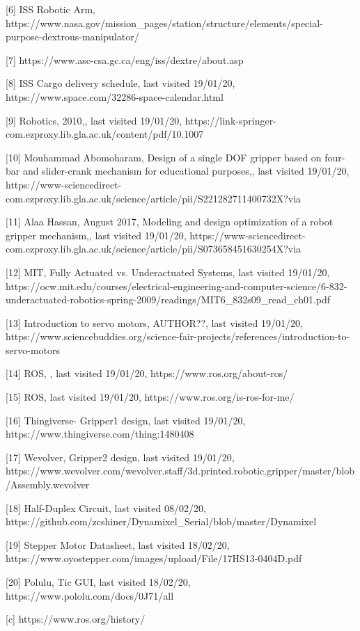 \documentclass{l4proj}
\begin{document}
[6] ISS Robotic Arm, https://www.nasa.gov/mission_pages/station/structure/elements/special-purpose-dextrous-manipulator/

[7] https://www.asc-csa.gc.ca/eng/iss/dextre/about.asp

[8] ISS Cargo delivery schedule, last visited 19/01/20, https://www.space.com/32286-space-calendar.html

[9] Robotics, 2010,, last visited 19/01/20, https://link-springer-com.ezproxy.lib.gla.ac.uk/content/pdf/10.1007%

[10] Mouhammad Abomoharam, Design of a single DOF gripper based on four-bar and slider-crank mechanism for educational purposes,, last visited 19/01/20, https://www-sciencedirect-com.ezproxy.lib.gla.ac.uk/science/article/pii/S221282711400732X?via%

[11] Alaa Hassan, August 2017, Modeling and design optimization of a robot gripper mechanism,, last visited 19/01/20, https://www-sciencedirect-com.ezproxy.lib.gla.ac.uk/science/article/pii/S073658451630254X?via%

[12] MIT, Fully Actuated vs. Underactuated Systems, last visited 19/01/20, https://ocw.mit.edu/courses/electrical-engineering-and-computer-science/6-832-underactuated-robotics-spring-2009/readings/MIT6_832s09_read_ch01.pdf

[13] Introduction to servo motors, AUTHOR??, last visited 19/01/20, https://www.sciencebuddies.org/science-fair-projects/references/introduction-to-servo-motors

[14] ROS, , last visited 19/01/20, https://www.ros.org/about-ros/

[15] ROS, last visited 19/01/20, https://www.ros.org/is-ros-for-me/

[16] Thingiverse- Gripper1 design, last visited 19/01/20, https://www.thingiverse.com/thing:1480408

[17] Wevolver, Gripper2 design, last visited 19/01/20, https://www.wevolver.com/wevolver.staff/3d.printed.robotic.gripper/master/blob/Assembly.wevolver

[18] Half-Duplex Circuit, last visited 08/02/20, https://github.com/zcshiner/Dynamixel_Serial/blob/master/Dynamixel%

[19] Stepper Motor Datasheet, last visited 18/02/20, https://www.oyostepper.com/images/upload/File/17HS13-0404D.pdf

[20] Polulu, Tic GUI, last visited 18/02/20, https://www.pololu.com/docs/0J71/all 

[c] https://www.ros.org/history/
\end{document}
